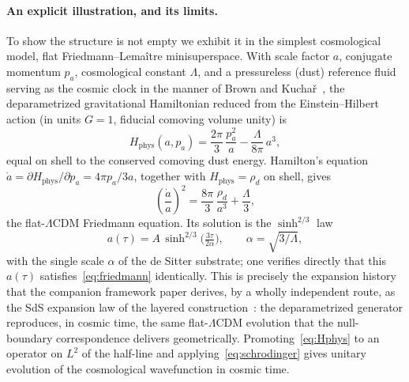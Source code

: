 \documentclass[11pt,a4paper]{article}
\theoremstyle{plain}
\theoremstyle{definition}
\theoremstyle{remark}
\newcommand{\Hphys}{H_{\mathrm{phys}}}
\begin{document}
\paragraph{An explicit illustration, and its limits.}
To show the structure is not empty we exhibit it in the simplest cosmological model, flat Friedmann--Lema\^itre minisuperspace. With scale factor $a$, conjugate momentum $p_a$, cosmological constant $\Lambda$, and a pressureless (dust) reference fluid serving as the cosmic clock in the manner of Brown and Kucha\v{r}~\cite{BrownKuchar1995}, the deparametrized gravitational Hamiltonian reduced from the Einstein--Hilbert action (in units $G=1$, fiducial comoving volume unity) is
\begin{equation}
\Hphys(a,p_a) = \frac{2\pi}{3}\,\frac{p_a^2}{a} - \frac{\Lambda}{8\pi}\,a^3,
\label{eq:Hphys}   %
\end{equation}
equal on shell to the conserved comoving dust energy. Hamilton's equation $\dot a = \partial \Hphys/\partial p_a = 4\pi p_a/3a$, together with $\Hphys = \rho_d$ on shell, gives
\begin{equation}
\left(\frac{\dot a}{a}\right)^2 = \frac{8\pi}{3}\,\frac{\rho_d}{a^3} + \frac{\Lambda}{3},
\label{eq:friedmann}
\end{equation}
the flat-$\Lambda$CDM Friedmann equation. Its solution is the $\sinh^{2/3}$ law
\begin{equation}
a(\tau) = A\,\sinh^{2/3}\!\Big(\tfrac{3\tau}{2\alpha}\Big),\qquad \alpha = \sqrt{3/\Lambda},
\end{equation}
with the single scale $\alpha$ of the de Sitter substrate; one verifies directly that this $a(\tau)$ satisfies~\eqref{eq:friedmann} identically. This is precisely the expansion history that the companion framework paper derives, by a wholly independent route, as the SdS expansion law of the layered construction~\cite{JanzenCRframework}: the deparametrized generator reproduces, in cosmic time, the same flat-$\Lambda$CDM evolution that the null-boundary correspondence delivers geometrically. Promoting~\eqref{eq:Hphys} to an operator on $L^2$ of the half-line and applying~\eqref{eq:schrodinger} gives unitary evolution of the cosmological wavefunction in cosmic time.
\end{document}
